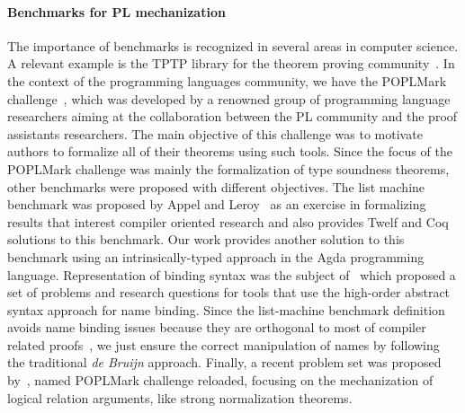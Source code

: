 \documentclass[review]{elsarticle}
\theoremstyle{definition}
\begin{document}
\paragraph{Benchmarks for PL mechanization}{
The importance of benchmarks is recognized in several areas in computer science. A relevant example is the
TPTP library for the theorem proving community~\cite{Sut17}. In the context of the programming languages community,
we have the POPLMark challenge~\cite{Aydemir05}, which was developed by a renowned group of programming language researchers aiming
at the collaboration between the PL community and the proof assistants researchers. The main objective of this challenge
was to motivate authors to formalize all of their theorems using such tools. Since the focus of the POPLMark challenge
was mainly the formalization of type soundness theorems, other benchmarks were proposed with different objectives. The list
machine benchmark was proposed by Appel and Leroy~\cite{Appel07} as an exercise in formalizing results that interest
compiler oriented research and also provides Twelf and Coq solutions to this benchmark. Our work provides another
solution to this benchmark using an intrinsically-typed approach in the Agda programming language. Representation of binding syntax
was the subject of~\cite{FeltyMP18} which proposed a set of problems and research questions for tools
that use the high-order abstract syntax approach for name binding. Since the list-machine benchmark definition avoids
name binding issues because they are orthogonal to most of compiler related proofs~\cite{Appel07}, we just ensure
the correct manipulation of names by following the traditional \emph{de Bruijn} approach. Finally, a recent problem set
was proposed by~\cite{Pientka18}, named POPLMark challenge reloaded, focusing on the mechanization
of logical relation arguments, like strong normalization theorems.}
\end{document}
